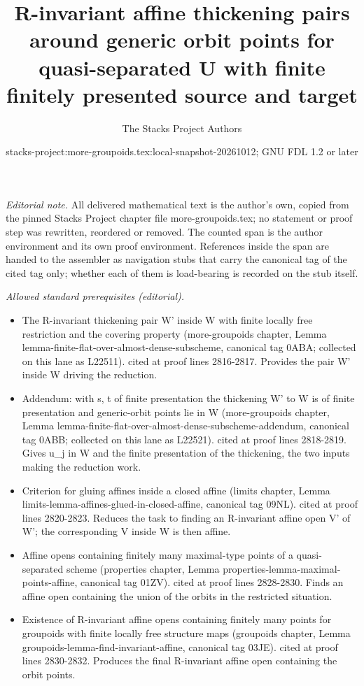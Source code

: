 \documentclass{stacks-project}
\title{R-invariant affine thickening pairs around generic orbit points for quasi-separated U with finite finitely presented source and target}
\author{The Stacks Project Authors}
\date{stacks-project:more-groupoids.tex:local-snapshot-20261012; GNU FDL 1.2 or later}
\theoremstyle{plain}
\theoremstyle{definition}
\theoremstyle{remark}
\numberwithin{equation}{subsection}
\begin{document}
\maketitle
\setcounter{subsection}{1}
\noindent\textit{Editorial note.} All delivered mathematical text is the author's own, copied from the pinned Stacks Project chapter file more-groupoids.tex; no statement or proof step was rewritten, reordered or removed. The counted span is the author environment and its own proof environment. References inside the span are handed to the assembler as navigation stubs that carry the canonical tag of the cited tag only; whether each of them is load-bearing is recorded on the stub itself.\par\medskip
\noindent\textit{Allowed standard prerequisites (editorial).}\begin{itemize}
\item The R-invariant thickening pair W' inside W with finite locally free restriction and the covering property (more-groupoids chapter, Lemma lemma-finite-flat-over-almost-dense-subscheme, canonical tag 0ABA; collected on this lane as L22511). cited at proof lines 2816-2817. Provides the pair W' inside W driving the reduction.
\item Addendum: with s, t of finite presentation the thickening W' to W is of finite presentation and generic-orbit points lie in W (more-groupoids chapter, Lemma lemma-finite-flat-over-almost-dense-subscheme-addendum, canonical tag 0ABB; collected on this lane as L22521). cited at proof lines 2818-2819. Gives u\_j in W and the finite presentation of the thickening, the two inputs making the reduction work.
\item Criterion for gluing affines inside a closed affine (limits chapter, Lemma limits-lemma-affines-glued-in-closed-affine, canonical tag 09NL). cited at proof lines 2820-2823. Reduces the task to finding an R-invariant affine open V' of W'; the corresponding V inside W is then affine.
\item Affine opens containing finitely many maximal-type points of a quasi-separated scheme (properties chapter, Lemma properties-lemma-maximal-points-affine, canonical tag 01ZV). cited at proof lines 2828-2830. Finds an affine open containing the union of the orbits in the restricted situation.
\item Existence of R-invariant affine opens containing finitely many points for groupoids with finite locally free structure maps (groupoids chapter, Lemma groupoids-lemma-find-invariant-affine, canonical tag 03JE). cited at proof lines 2830-2832. Produces the final R-invariant affine open containing the orbit points.
\end{itemize}\medskip
\end{document}
